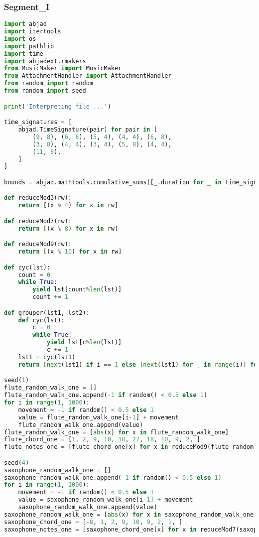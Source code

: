 \subsubsection{Segment\_I}
\singlespace
\begin{lstlisting}[language=Python, caption=Four Ages of Sand Segment\_I]
import abjad
import itertools
import os
import pathlib
import time
import abjadext.rmakers
from MusicMaker import MusicMaker
from AttachmentHandler import AttachmentHandler
from random import random
from random import seed

print('Interpreting file ...')

time_signatures = [
    abjad.TimeSignature(pair) for pair in [
        (9, 8), (6, 8), (5, 4), (4, 4), (6, 8),
        (3, 8), (4, 4), (3, 4), (5, 8), (4, 4),
        (11, 8),
    ]
]

bounds = abjad.mathtools.cumulative_sums([_.duration for _ in time_signatures])

def reduceMod3(rw):
    return [(x % 4) for x in rw]

def reduceMod7(rw):
    return [(x % 8) for x in rw]

def reduceMod9(rw):
    return [(x % 10) for x in rw]

def cyc(lst):
    count = 0
    while True:
        yield lst[count%len(lst)]
        count += 1

def grouper(lst1, lst2):
    def cyc(lst):
        c = 0
        while True:
            yield lst[c%len(lst)]
            c += 1
    lst1 = cyc(lst1)
    return [next(lst1) if i == 1 else [next(lst1) for _ in range(i)] for i in lst2]

seed(1)
flute_random_walk_one = []
flute_random_walk_one.append(-1 if random() < 0.5 else 1)
for i in range(1, 1000):
    movement = -1 if random() < 0.5 else 1
    value = flute_random_walk_one[i-1] + movement
    flute_random_walk_one.append(value)
flute_random_walk_one = [abs(x) for x in flute_random_walk_one]
flute_chord_one = [1, 2, 9, 10, 18, 27, 18, 10, 9, 2, ]
flute_notes_one = [flute_chord_one[x] for x in reduceMod9(flute_random_walk_one)]

seed(4)
saxophone_random_walk_one = []
saxophone_random_walk_one.append(-1 if random() < 0.5 else 1)
for i in range(1, 1000):
    movement = -1 if random() < 0.5 else 1
    value = saxophone_random_walk_one[i-1] + movement
    saxophone_random_walk_one.append(value)
saxophone_random_walk_one = [abs(x) for x in saxophone_random_walk_one]
saxophone_chord_one = [-8, 1, 2, 9, 10, 9, 2, 1, ]
saxophone_notes_one = [saxophone_chord_one[x] for x in reduceMod7(saxophone_random_walk_one)]


\end{lstlisting}
